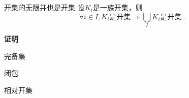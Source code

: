 \begin{theorem}{开集的无限并也是开集}
设${K_i}$是一族开集，则
\begin{equation}
\forall{i}\in{I},K_i\text{是开集}\Rightarrow{\bigcup_{I}K_i\text{是开集}}~.
\end{equation}
\end{theorem}

\textbf{证明}



\begin{definition}{完备集}

\end{definition}

\begin{definition}{闭包}
\end{definition}

\begin{definition}{相对开集}

\end{definition}
